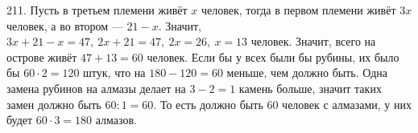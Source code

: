 211. Пусть в третьем племени живёт $x$ человек, тогда в первом племени живёт $3x$ человек, а во втором --- $21-x.$ Значит, $3x+21-x=47,\ 2x+21=47,\ 2x=26,\ x=13$ человек. Значит, всего на острове живёт $47+13=60$ человек. Если бы у всех были бы рубины, их было бы $60\cdot2=120$ штук, что на $180-120=60$ меньше, чем должно быть. Одна замена рубинов на алмазы делает на $3-2=1$ камень больше, значит таких замен должно быть $60:1=60.$ То есть должно быть 60 человек с алмазами, у них будет $60\cdot3=180$ алмазов.\\
